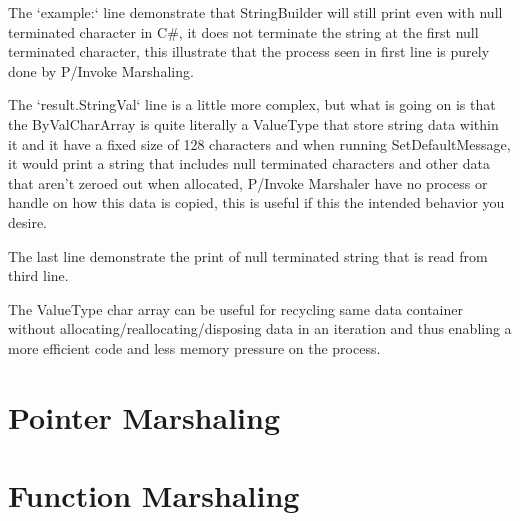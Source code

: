The `example:` line demonstrate that StringBuilder will still print even with null terminated character in C\#, it does not terminate the string at the first null terminated character, this illustrate that the process seen in first line is purely done by P/Invoke Marshaling.

The `result.StringVal` line is a little more complex, but what is going on is that the ByValCharArray is quite literally a ValueType that store string data within it and it have a fixed size of 128 characters and when running SetDefaultMessage, it would print a string that includes null terminated characters and other data that aren't zeroed out when allocated, P/Invoke Marshaler have no process or handle on how this data is copied, this is useful if this the intended behavior you desire.

The last line demonstrate the print of null terminated string that is read from third line.

The ValueType char array can be useful for recycling same data container without allocating/reallocating/disposing data in an iteration and thus enabling a more efficient code and less memory pressure on the process.


\section{Pointer Marshaling}

\section{Function Marshaling}